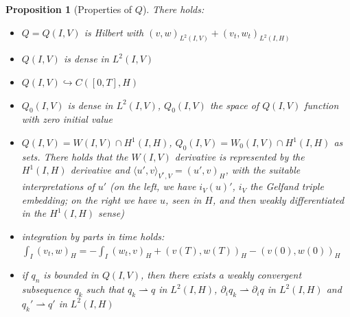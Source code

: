 \documentclass[english,a4paper,10pt,oneside]{scrbook}	%
\theoremstyle{break}
\newtheorem{prop}[equation]{Proposition}
\theoremstyle{remark}
\newcommand{\emb}{\hookrightarrow}
\newcommand{\weakc}{\rightharpoonup}
\begin{document}
\begin{prop}[Properties of $Q$]
\label{prop:Q}
There holds:
\begin{itemize}
	\item $Q=Q(I,V)$ is Hilbert with $(v,w)_{L^2(I,V)} + (v_t,w_t)_{L^2(I,H)}$ 
	\item $Q(I,V)$ is dense in $L^2(I,V)$
	\item $Q(I,V)\emb C([0,T],H)$
	\item $Q_0(I,V)$ is dense in $L^2(I,V)$, $Q_0(I,V)$ the space of $Q(I,V)$ function with zero initial value
	\item $Q(I,V) = W(I,V)\cap H^1(I,H)$, $Q_0(I,V) =  W_0(I,V)\cap H^1(I,H)$ as sets. There holds that the $W(I,V)$ derivative is represented by the $H^1(I,H)$ derivative and $\langle u', v\rangle_{V^*,V} = (u',v)_H$, with the suitable interpretations of $u'$ (on the left, we have $i_V(u)'$, $i_V$ the Gelfand triple embedding; on the right we have $u$, seen in $H$, and then weakly differentiated in the $H^1(I,H)$ sense)
	\item integration by parts in time holds: $\int_I(v_t,w)_H = -\int_I(w_t,v)_H +(v(T),w(T))_H-(v(0),w(0))_H$
	\item if $q_n$ is bounded in $Q(I,V)$, then there exists a weakly convergent subsequence $q_k$ such that $q_k\weakc q$ in $L^2(I,H)$, $\partial_i q_k\weakc \partial_i q$ in $L^2(I,H)$ and $q_k'\weakc q'$ in $L^2(I,H)$
\end{itemize}
\end{prop}
\end{document}
